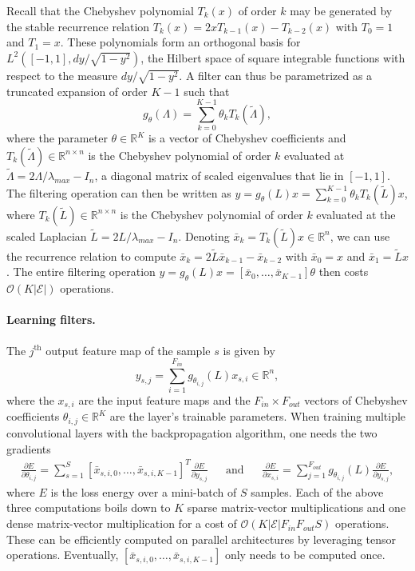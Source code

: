 \documentclass{article}
\newcommand{\E}{\mathcal{E}}
\newcommand{\bO}{\mathcal{O}}
\newcommand{\R}{\mathbb{R}}
\begin{document}
Recall that the Chebyshev polynomial $T_k(x)$ of order $k$ may be generated by
the stable recurrence relation $T_k(x) = 2x T_{k-1}(x) - T_{k-2}(x)$ with $T_0 =
1$ and $T_1 = x$. These polynomials form an orthogonal basis for $L^2([-1,1], dy
/ \sqrt{1-y^2})$, the Hilbert space of square integrable functions with respect
to the measure $dy/\sqrt{1-y^2}$. A filter can thus be parametrized as a
truncated expansion of order $K-1$ such that
\begin{equation} \label{eq:filt_cheby}
	g_\theta(\Lambda) = \sum_{k=0}^{K-1} \theta_k T_k(\tilde{\Lambda}),
\end{equation}
where the parameter $\theta \in \R^K$ is a vector of Chebyshev coefficients and
$T_k(\tilde{\Lambda}) \in \R^{n \times n}$ is the Chebyshev polynomial of order
$k$ evaluated at $\tilde{\Lambda} = 2 \Lambda / \lambda_{max} - I_n$, a diagonal
matrix of scaled eigenvalues that lie in $[-1,1]$.
The filtering operation can then be written as $y = g_\theta(L) x
= \sum_{k=0}^{K-1} \theta_k T_k(\tilde{L}) x$, where $T_k(\tilde{L}) \in \R^{n
\times n}$ is the Chebyshev polynomial of order $k$ evaluated at the scaled
Laplacian $\tilde{L} = 2 L / \lambda_{max} - I_n$. %
Denoting $\bar{x}_k =
T_k(\tilde{L})x \in \R^n$, we can use the recurrence relation to compute
$\bar{x}_k = 2\tilde{L} \bar{x}_{k-1} - \bar{x}_{k-2}$ with $\bar{x}_0 = x$ and
$\bar{x}_1 = \tilde{L}x$. The entire filtering operation
	$y = g_\theta(L) x = [\bar{x}_0, \ldots, \bar{x}_{K-1}] \theta$
then costs $\bO(K|\E|)$ operations.

\paragraph{Learning filters.} The $j^\text{th}$ output feature map of the sample
$s$ is given by
\begin{equation} \label{eq:filterbank}
	y_{s,j} = \sum_{i=1}^{F_{in}} g_{\theta_{i,j}}(L) x_{s,i} \in \R^n,
\end{equation}
where the $x_{s,i}$ are the input feature maps and the $F_{in} \times F_{out}$
vectors of Chebyshev coefficients $\theta_{i,j} \in \R^K$ are the layer's
trainable parameters. When training multiple convolutional layers with the
backpropagation algorithm, one needs the two gradients
\begin{align}
	\frac{\partial E}{\partial \theta_{i,j}} =
	\sum_{s=1}^S [\bar{x}_{s,i,0}, \ldots, \bar{x}_{s,i,K-1}]^T
	\frac{\partial E}{\partial y_{s,j}}
	&& \text{and} &&
	\frac{\partial E}{\partial x_{s,i}} =
	\sum_{j=1}^{F_{out}} g_{\theta_{i,j}}(L)
	\frac{\partial E}{\partial y_{s,j}},
\end{align}
where $E$ is the loss energy over a mini-batch of $S$ samples. Each of the
above three computations boils down to $K$ sparse matrix-vector multiplications
and one dense matrix-vector multiplication for a cost of $\bO(K |\E| F_{in}
F_{out} S)$ operations. These can be efficiently computed on parallel
architectures by leveraging tensor operations. Eventually, $[\bar{x}_{s,i,0},
\ldots, \bar{x}_{s,i,K-1}]$ only needs to be computed once.
\end{document}
